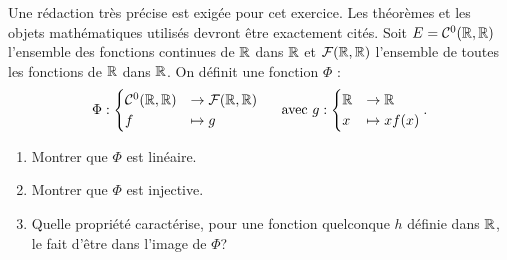 Une rédaction très précise est exigée pour cet exercice. Les théorèmes et les objets mathématiques utilisés devront être exactement cités.\newline
Soit $E=\mathcal{C}^{0}(\mathbb{R},\mathbb{R})$ l'ensemble des fonctions continues de $\mathbb{R}$ dans $\mathbb{R}$ et $\mathcal{F}(\mathbb{R},\mathbb{R})$ l'ensemble de toutes les fonctions de $\mathbb{R}$ dans $\mathbb{R}$. On définit une fonction $\Phi$ :
\begin{displaymath}
 \Phi : \begin{cases}\mathcal{C}^{0}(\mathbb{R},\mathbb{R}) &\rightarrow \mathcal{F}(\mathbb{R},\mathbb{R}) \\ f &\mapsto g \end{cases}\hspace{0.4cm} \text{ avec } g : \begin{cases}\mathbb{R} &\rightarrow \mathbb{R} \\ x &\mapsto xf(x) \end{cases}.
\end{displaymath}
\begin{enumerate}
 \item Montrer que $\Phi$ est linéaire.
\item Montrer que $\Phi$ est injective.
\item Quelle propriété caractérise, pour une fonction quelconque $h$ définie dans $\mathbb{R}$, le fait d'être dans l'image de $\Phi$?
\end{enumerate}